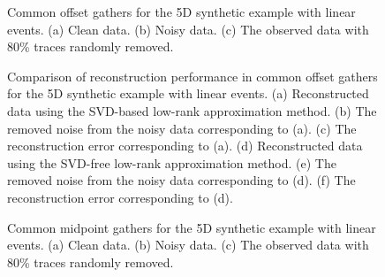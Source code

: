 \begin{figure}[htb!]
 \centering
  \caption{Common offset gathers for the 5D synthetic example with linear events. (a) Clean data. (b) Noisy data. (c) The observed data with 80\% traces randomly removed.}
  \label{fig:syn5d-clean-3d,syn5d-noisy-3d,syn5d-decimated-3d}
\end{figure}

\begin{figure}[htb!]
  \centering
   \caption{Comparison of reconstruction performance in common offset gathers for the 5D synthetic example with linear events. (a) Reconstructed data using the SVD-based low-rank approximation method. (b) The removed noise from the noisy data corresponding to (a). (c) The reconstruction error corresponding to (a). (d) Reconstructed data using the SVD-free low-rank approximation method. (e) The removed noise from the noisy data corresponding to (d). (f) The reconstruction error corresponding to (d).}
\label{fig:syn5d-svd-3d,syn5d-n-svd-3d,syn5d-r-svd-3d,syn5d-lmafit-3d,syn5d-n-lmafit-3d,syn5d-r-lmafit-3d}
\end{figure}


\begin{figure}[htb!]
  \centering
   \caption{Common midpoint gathers for the 5D synthetic example with linear events. (a) Clean data. (b) Noisy data. (c) The observed data with 80\% traces randomly removed.}
   \label{fig:syn5d-clean-3d-1,syn5d-noisy-3d-1,syn5d-decimated-3d-1}
\end{figure}


